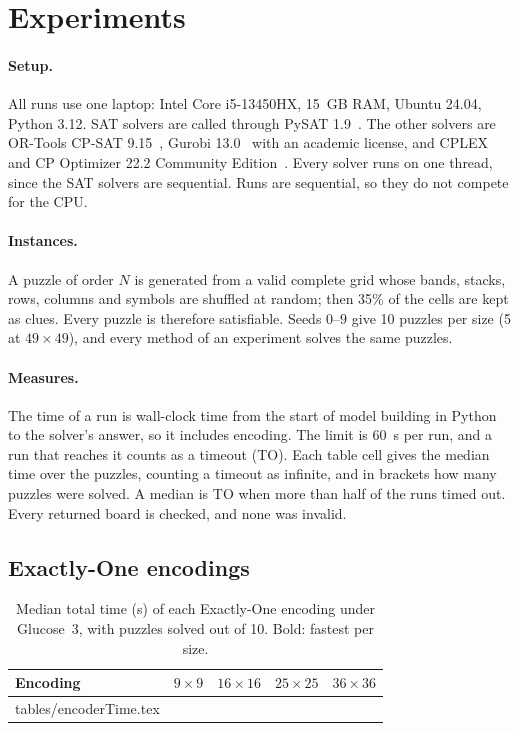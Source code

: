 \section{Experiments}\label{sec:exp}

\paragraph{Setup.} All runs use one laptop: Intel Core i5-13450HX, 15~GB RAM, Ubuntu 24.04, Python 3.12. SAT solvers are called through PySAT 1.9~\cite{pysat}. The other solvers are OR-Tools CP-SAT 9.15~\cite{ortools}, Gurobi 13.0~\cite{gurobi} with an academic license, and CPLEX and CP Optimizer 22.2 Community Edition~\cite{cplex}. Every solver runs on one thread, since the SAT solvers are sequential. Runs are sequential, so they do not compete for the CPU.

\paragraph{Instances.} A puzzle of order $N$ is generated from a valid complete grid whose bands, stacks, rows, columns and symbols are shuffled at random; then 35\% of the cells are kept as clues. Every puzzle is therefore satisfiable. Seeds $0$--$9$ give 10 puzzles per size (5 at $49\times49$), and every method of an experiment solves the same puzzles.

\paragraph{Measures.} The time of a run is wall-clock time from the start of model building in Python to the solver's answer, so it includes encoding. The limit is 60~s per run, and a run that reaches it counts as a timeout (TO). Each table cell gives the median time over the puzzles, counting a timeout as infinite, and in brackets how many puzzles were solved. A median is TO when more than half of the runs timed out. Every returned board is checked, and none was invalid.

\subsection{Exactly-One encodings}

\begin{table}[t]
\caption{Median total time (s) of each Exactly-One encoding under Glucose~3, with puzzles solved out of 10. Bold: fastest per size.}\label{tab:enc}
\centering\small
\begin{tabular}{lrrrr}
\toprule
Encoding & $9\times9$ & $16\times16$ & $25\times25$ & $36\times36$ \\
\midrule
{} tables/encoderTime.tex 
\bottomrule
\end{tabular}
\end{table}

